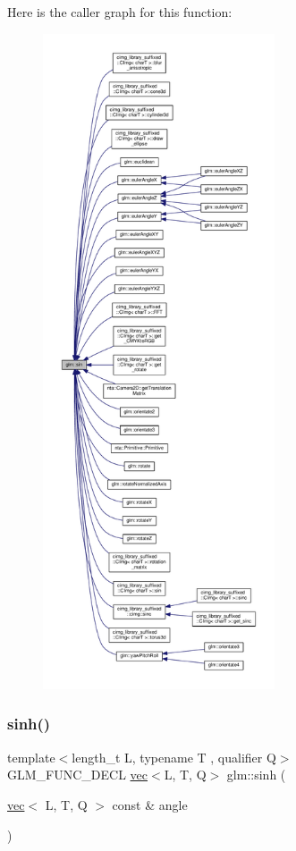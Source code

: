Here is the caller graph for this function\+:
\nopagebreak
\begin{figure}[H]
\begin{center}
\leavevmode
\includegraphics[height=550pt]{dc/d43/group__core__func__trigonometric_ga29747fd108cb7292ae5a284f69691a69_icgraph}
\end{center}
\end{figure}
\mbox{\label{group__core__func__trigonometric_gac7c39ff21809e281552b4dbe46f4a39d}} 
\subsubsection{\texorpdfstring{sinh()}{sinh()}}
{\footnotesize\ttfamily template$<$length\+\_\+t L, typename T , qualifier Q$>$ \\
G\+L\+M\+\_\+\+F\+U\+N\+C\+\_\+\+D\+E\+CL \hyperlink{structglm_1_1vec}{vec}$<$L, T, Q$>$ glm\+::sinh (\begin{DoxyParamCaption}\item[{\hyperlink{structglm_1_1vec}{vec}$<$ L, T, Q $>$ const \&}]{angle }\end{DoxyParamCaption})}



